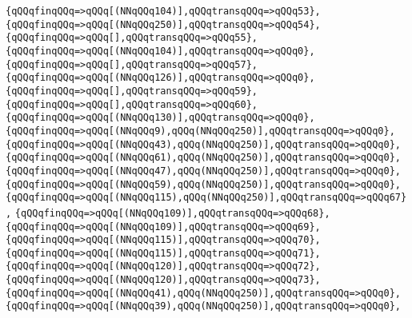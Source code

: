 \verb|{qQQqfinqQQq=>qQQq[(NNqQQq104)],qQQqtransqQQq=>qQQq53},|\newline
\verb|{qQQqfinqQQq=>qQQq[(NNqQQq250)],qQQqtransqQQq=>qQQq54},|\newline
\verb|{qQQqfinqQQq=>qQQq[],qQQqtransqQQq=>qQQq55},|\newline
\verb|{qQQqfinqQQq=>qQQq[(NNqQQq104)],qQQqtransqQQq=>qQQq0},|\newline
\verb|{qQQqfinqQQq=>qQQq[],qQQqtransqQQq=>qQQq57},|\newline
\verb|{qQQqfinqQQq=>qQQq[(NNqQQq126)],qQQqtransqQQq=>qQQq0},|\newline
\verb|{qQQqfinqQQq=>qQQq[],qQQqtransqQQq=>qQQq59},|\newline
\verb|{qQQqfinqQQq=>qQQq[],qQQqtransqQQq=>qQQq60},|\newline
\verb|{qQQqfinqQQq=>qQQq[(NNqQQq130)],qQQqtransqQQq=>qQQq0},|\newline
\verb|{qQQqfinqQQq=>qQQq[(NNqQQq9),qQQq(NNqQQq250)],qQQqtransqQQq=>qQQq0},|\newline
\verb|{qQQqfinqQQq=>qQQq[(NNqQQq43),qQQq(NNqQQq250)],qQQqtransqQQq=>qQQq0},|\newline
\verb|{qQQqfinqQQq=>qQQq[(NNqQQq61),qQQq(NNqQQq250)],qQQqtransqQQq=>qQQq0},|\newline
\verb|{qQQqfinqQQq=>qQQq[(NNqQQq47),qQQq(NNqQQq250)],qQQqtransqQQq=>qQQq0},|\newline
\verb|{qQQqfinqQQq=>qQQq[(NNqQQq59),qQQq(NNqQQq250)],qQQqtransqQQq=>qQQq0},|\newline
\verb|{qQQqfinqQQq=>qQQq[(NNqQQq115),qQQq(NNqQQq250)],qQQqtransqQQq=>qQQq67},|\newline
\verb|{qQQqfinqQQq=>qQQq[(NNqQQq109)],qQQqtransqQQq=>qQQq68},|\newline
\verb|{qQQqfinqQQq=>qQQq[(NNqQQq109)],qQQqtransqQQq=>qQQq69},|\newline
\verb|{qQQqfinqQQq=>qQQq[(NNqQQq115)],qQQqtransqQQq=>qQQq70},|\newline
\verb|{qQQqfinqQQq=>qQQq[(NNqQQq115)],qQQqtransqQQq=>qQQq71},|\newline
\verb|{qQQqfinqQQq=>qQQq[(NNqQQq120)],qQQqtransqQQq=>qQQq72},|\newline
\verb|{qQQqfinqQQq=>qQQq[(NNqQQq120)],qQQqtransqQQq=>qQQq73},|\newline
\verb|{qQQqfinqQQq=>qQQq[(NNqQQq41),qQQq(NNqQQq250)],qQQqtransqQQq=>qQQq0},|\newline
\verb|{qQQqfinqQQq=>qQQq[(NNqQQq39),qQQq(NNqQQq250)],qQQqtransqQQq=>qQQq0},|\newline
